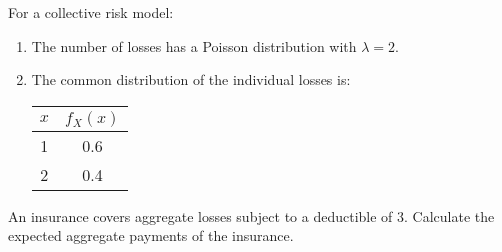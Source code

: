  For a collective risk model:
\begin{enumerate}
\item The number of losses has a Poisson distribution with $\lambda=2$.
\item The common distribution of the individual losses is:
  \begin{center}\begin{tabular}{cc} 
    $x$ & $f_X(x)$ \\ \hline
    1 & 0.6 \\
    2 & 0.4
  \end{tabular}\end{center}
\end{enumerate}
An insurance covers aggregate losses subject to a deductible of 3.
Calculate the expected aggregate payments of the insurance.
